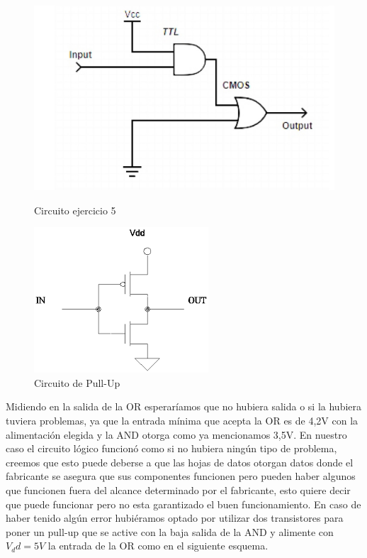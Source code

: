 \begin{figure}[H]
\begin{center}
  \begin{minipage}[b]{0.4\textwidth}
  	\begin{center}
  		\includegraphics[scale=0.5]{ejercicio5/E3_CirEj5.jpg} 
  	\end{center}
  \caption{Circuito ejercicio 5}
  \end{minipage}
  \begin{minipage}[b]{0.4\textwidth}
    \begin{center}
  		\includegraphics[scale=0.5]{ejercicio5/PullUp.jpg} 
	\end{center}
  \caption{Circuito de Pull-Up}
   \end{minipage}
\end{center}
\end{figure}

Midiendo en la salida de la OR esperaríamos que no hubiera salida o si la hubiera tuviera problemas, ya que la entrada mínima que acepta la OR es de 4,2V con la alimentación elegida y la AND otorga como ya mencionamos 3,5V. En nuestro caso el circuito lógico funcionó como si no hubiera ningún tipo de problema, creemos que esto puede deberse a que las hojas de datos otorgan datos donde el fabricante se asegura que sus componentes funcionen pero pueden haber algunos que funcionen fuera del alcance determinado por el fabricante, esto quiere decir que puede funcionar pero no esta garantizado el buen funcionamiento. En caso de haber tenido algún error hubi\'eramos optado por utilizar dos transistores para poner un pull-up que se active con la baja salida de la AND y alimente con $V_dd=5V$ la entrada de la OR como en el siguiente esquema.


